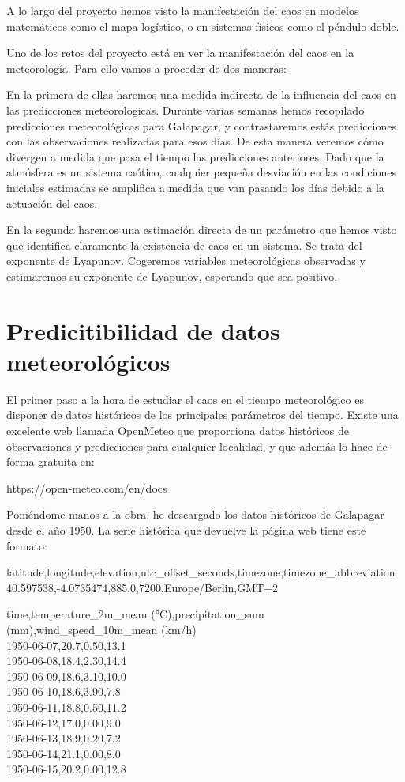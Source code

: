 \documentclass[
  10pt,
  a4paper,
  DIV=11,
  numbers=noendperiod,
  open=any]{scrreprt}
\numberwithin{equation}{chapter}
\numberwithin{equation}{chapter}
\renewcommand{\[}{\begin{equation}}
\renewcommand{\]}{\end{equation}}
\begin{document}
A lo largo del proyecto hemos visto la manifestación del caos en modelos
matemáticos como el mapa logístico, o en sistemas físicos como el
péndulo doble.

Uno de los retos del proyecto está en ver la manifestación del caos en
la meteorología. Para ello vamos a proceder de dos maneras:

En la primera de ellas haremos una medida indirecta de la influencia del
caos en las predicciones meteorologicas. Durante varias semanas hemos
recopilado predicciones meteorológicas para Galapagar, y contrastaremos
estás predicciones con las observaciones realizadas para esos días. De
esta manera veremos cómo divergen a medida que pasa el tiempo las
predicciones anteriores. Dado que la atmósfera es un sistema caótico,
cualquier pequeña desviación en las condiciones iniciales estimadas se
amplifica a medida que van pasando los días debido a la actuación del
caos.

En la segunda haremos una estimación directa de un parámetro que hemos
visto que identifica claramente la existencia de caos en un sistema. Se
trata del exponente de Lyapunov. Cogeremos variables meteorológicas
observadas y estimaremos su exponente de Lyapunov, esperando que sea
positivo.


\chapter{Predicitibilidad de datos
meteorológicos}\label{predicitibilidad-de-datos-meteoroluxf3gicos}

El primer paso a la hora de estudiar el caos en el tiempo meteorológico
es disponer de datos históricos de los principales parámetros del
tiempo. Existe una excelente web llamada
\href{https://open-meteo.com/en/docs}{OpenMeteo} que proporciona datos
históricos de observaciones y predicciones para cualquier localidad, y
que además lo hace de forma gratuita en:

https://open-meteo.com/en/docs

Poniéndome manos a la obra, he descargado los datos históricos de
Galapagar desde el año 1950. La serie histórica que devuelve la página
web tiene este formato:

latitude,longitude,elevation,utc\_offset\_seconds,timezone,timezone\_abbreviation\\
40.597538,-4.0735474,885.0,7200,Europe/Berlin,GMT+2

time,temperature\_2m\_mean (°C),precipitation\_sum
(mm),wind\_speed\_10m\_mean (km/h)\\
1950-06-07,20.7,0.50,13.1\\
1950-06-08,18.4,2.30,14.4\\
1950-06-09,18.6,3.10,10.0\\
1950-06-10,18.6,3.90,7.8\\
1950-06-11,18.8,0.50,11.2\\
1950-06-12,17.0,0.00,9.0\\
1950-06-13,18.9,0.20,7.2\\
1950-06-14,21.1,0.00,8.0\\
1950-06-15,20.2,0.00,12.8
\end{document}
